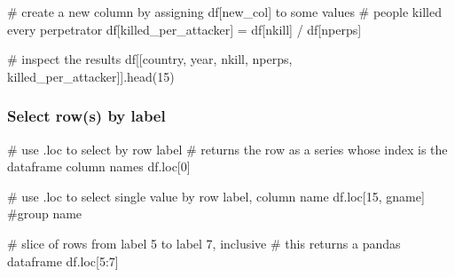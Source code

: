 \documentclass[
  letterpaper,
  DIV=11,
  numbers=noendperiod]{scrreprt}
\newenvironment{Shaded}{\begin{snugshade}}{\end{snugshade}}
\newcommand{\CommentTok}[1]{\textcolor[rgb]{0.37,0.37,0.37}{#1}}
\newcommand{\DecValTok}[1]{\textcolor[rgb]{0.68,0.00,0.00}{#1}}
\newcommand{\NormalTok}[1]{\textcolor[rgb]{0.00,0.23,0.31}{#1}}
\newcommand{\OperatorTok}[1]{\textcolor[rgb]{0.37,0.37,0.37}{#1}}
\newcommand{\StringTok}[1]{\textcolor[rgb]{0.13,0.47,0.30}{#1}}
\begin{document}
\begin{Shaded}
\begin{Highlighting}[]
\CommentTok{\# create a new column by assigning df[\textquotesingle{}new\_col\textquotesingle{}] to some values}
\CommentTok{\# people killed every perpetrator }
\NormalTok{df[}\StringTok{\textquotesingle{}killed\_per\_attacker\textquotesingle{}}\NormalTok{] }\OperatorTok{=}\NormalTok{ df[}\StringTok{\textquotesingle{}nkill\textquotesingle{}}\NormalTok{] }\OperatorTok{/}\NormalTok{ df[}\StringTok{\textquotesingle{}nperps\textquotesingle{}}\NormalTok{]}

\CommentTok{\# inspect the results}
\NormalTok{df[[}\StringTok{\textquotesingle{}country\textquotesingle{}}\NormalTok{, }\StringTok{\textquotesingle{}year\textquotesingle{}}\NormalTok{, }\StringTok{\textquotesingle{}nkill\textquotesingle{}}\NormalTok{, }\StringTok{\textquotesingle{}nperps\textquotesingle{}}\NormalTok{, }\StringTok{\textquotesingle{}killed\_per\_attacker\textquotesingle{}}\NormalTok{]].head(}\DecValTok{15}\NormalTok{)}
\end{Highlighting}
\end{Shaded}

\hypertarget{select-rows-by-label}{%
\subsubsection{Select row(s) by label}\label{select-rows-by-label}}

\begin{Shaded}
\begin{Highlighting}[]
\CommentTok{\# use .loc to select by row label}
\CommentTok{\# returns the row as a series whose index is the dataframe column names}
\NormalTok{df.loc[}\DecValTok{0}\NormalTok{]}
\end{Highlighting}
\end{Shaded}

\begin{Shaded}
\begin{Highlighting}[]
\CommentTok{\# use .loc to select single value by row label, column name}
\NormalTok{df.loc[}\DecValTok{15}\NormalTok{, }\StringTok{\textquotesingle{}gname\textquotesingle{}}\NormalTok{] }\CommentTok{\#group name}
\end{Highlighting}
\end{Shaded}

\begin{Shaded}
\begin{Highlighting}[]
\CommentTok{\# slice of rows from label 5 to label 7, inclusive}
\CommentTok{\# this returns a pandas dataframe}
\NormalTok{df.loc[}\DecValTok{5}\NormalTok{:}\DecValTok{7}\NormalTok{]}
\end{Highlighting}
\end{Shaded}
\end{document}
